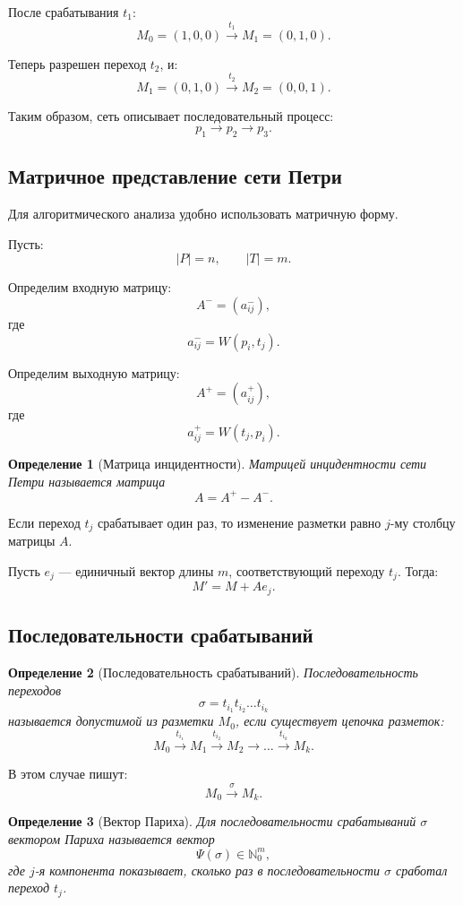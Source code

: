 \documentclass[12pt,a4paper]{article}
\newtheorem{definition}{Определение}
\begin{document}
После срабатывания $t_1$:
\[
M_0 = (1,0,0) \xrightarrow{t_1} M_1 = (0,1,0).
\]

Теперь разрешен переход $t_2$, и:
\[
M_1 = (0,1,0) \xrightarrow{t_2} M_2 = (0,0,1).
\]

Таким образом, сеть описывает последовательный процесс:
\[
p_1 \to p_2 \to p_3.
\]

\subsection{Матричное представление сети Петри}

Для алгоритмического анализа удобно использовать матричную форму.

Пусть:
\[
|P| = n,
\qquad
|T| = m.
\]

Определим входную матрицу:
\[
A^- = (a^-_{ij}),
\]
где
\[
a^-_{ij} = W(p_i,t_j).
\]

Определим выходную матрицу:
\[
A^+ = (a^+_{ij}),
\]
где
\[
a^+_{ij} = W(t_j,p_i).
\]

\begin{definition}[Матрица инцидентности]
Матрицей инцидентности сети Петри называется матрица
\[
A = A^+ - A^-.
\]
\end{definition}

Если переход $t_j$ срабатывает один раз, то изменение разметки равно $j$-му столбцу матрицы $A$.

Пусть $e_j$ --- единичный вектор длины $m$, соответствующий переходу $t_j$. Тогда:
\[
M' = M + A e_j.
\]

\subsection{Последовательности срабатываний}

\begin{definition}[Последовательность срабатываний]
Последовательность переходов
\[
\sigma = t_{i_1}t_{i_2}\dots t_{i_k}
\]
называется допустимой из разметки $M_0$, если существует цепочка разметок:
\[
M_0 \xrightarrow{t_{i_1}} M_1
\xrightarrow{t_{i_2}} M_2
\to \dots
\xrightarrow{t_{i_k}} M_k.
\]
\end{definition}

В этом случае пишут:
\[
M_0 \xrightarrow{\sigma} M_k.
\]

\begin{definition}[Вектор Париха]
Для последовательности срабатываний $\sigma$ вектором Париха называется вектор
\[
\Psi(\sigma) \in \mathbb{N}_0^m,
\]
где $j$-я компонента показывает, сколько раз в последовательности $\sigma$ сработал переход $t_j$.
\end{definition}
\end{document}
